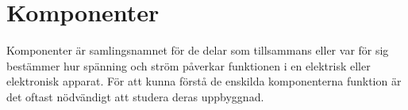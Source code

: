 \chapter{Komponenter}
\label{ch:komponenter}

Komponenter är samlingsnamnet för de delar som tillsammans eller var för sig
bestämmer hur spänning och ström påverkar funktionen i en elektrisk eller
elektronisk apparat.
För att kunna förstå de enskilda komponenterna funktion är det oftast nödvändigt
att studera deras uppbyggnad.
